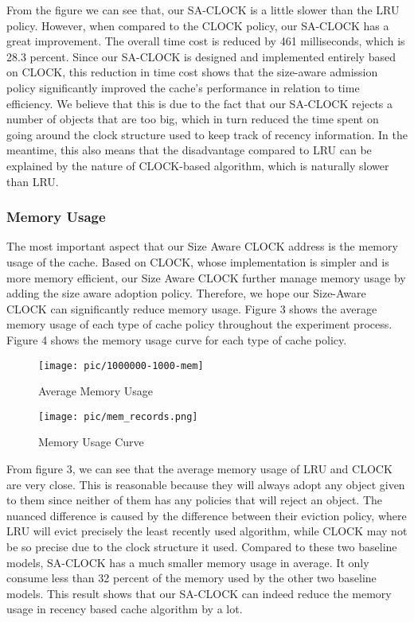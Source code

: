 \documentclass[journal,10.5pt,onecolumn]{IEEEtran}
\begin{document}
From the figure we can see that, our SA-CLOCK is a little slower than the LRU policy. However, when compared to the CLOCK policy, our SA-CLOCK has a great improvement. The overall time cost is reduced by 461 milliseconds, which is 28.3 percent. Since our SA-CLOCK is designed and implemented entirely based on CLOCK, this reduction in time cost shows that the size-aware admission policy significantly improved the cache's performance in relation to time efficiency. We believe that this is due to the fact that our SA-CLOCK rejects a number of objects that are too big, which in turn reduced the time spent on going around the clock structure used to keep track of recency information. In the meantime, this also means that the disadvantage compared to LRU can be explained by the nature of CLOCK-based algorithm, which is naturally slower than LRU.


\subsubsection{Memory Usage}
The most important aspect that our Size Aware CLOCK address is the memory usage of the cache. Based on CLOCK, whose implementation is simpler and is more memory efficient, our Size Aware CLOCK further manage memory usage by adding the size aware adoption policy. Therefore, we hope our Size-Aware CLOCK can significantly reduce memory usage. Figure 3 shows the average memory usage of each type of cache policy throughout the experiment process. Figure 4 shows the memory usage curve for each type of cache policy.

\begin{figure}[h]
\centerline{\texttt{[image: pic/1000000-1000-mem]}}
\caption{Average Memory Usage}
\label{fig}
\end{figure}

\begin{figure}[h]
\centerline{\texttt{[image: pic/mem\_records.png]}}
\caption{Memory Usage Curve}
\label{fig}
\end{figure}

From figure 3, we can see that the average memory usage of LRU and CLOCK are very close. This is reasonable because they will always adopt any object given to them since neither of them has any policies that will reject an object. The nuanced difference is caused by the difference between their eviction policy, where LRU will evict precisely the least recently used algorithm, while CLOCK may not be so precise due to the clock structure it used. Compared to these two baseline models, SA-CLOCK has a much smaller memory usage in average. It only consume less than 32 percent of the memory used by the other two baseline models. This result shows that our SA-CLOCK can indeed reduce the memory usage in recency based cache algorithm by a lot.  
\end{document}
